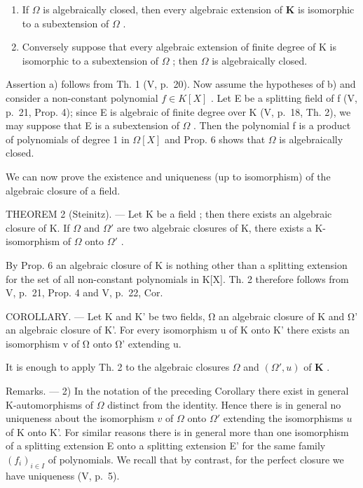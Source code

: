 \begin{enumerate}
\def\labelenumi{\alph{enumi})}
\item
  If \(\Omega\) is algebraically closed, then every algebraic extension of \(\mathbf{K}\) is isomorphic to a subextension of \(\Omega\) .
\item
  Conversely suppose that every algebraic extension of finite degree of K is isomorphic to a subextension of \(\Omega\) ; then \(\Omega\) is algebraically closed.
\end{enumerate}

Assertion a) follows from Th. 1 (V, p.~20). Now assume the hypotheses of b) and consider a non-constant polynomial \(f \in K[X]\) . Let E be a splitting field of f (V, p.~21, Prop. 4); since E is algebraic of finite degree over K (V, p.~18, Th. 2), we may suppose that E is a subextension of \(\Omega\) . Then the polynomial f is a product of polynomials of degree 1 in \(\Omega[X]\) and Prop. 6 shows that \(\Omega\) is algebraically closed.

We can now prove the existence and uniqueness (up to isomorphism) of the algebraic closure of a field.

THEOREM 2 (Steinitz). --- Let K be a field ; then there exists an algebraic closure of K. If \(\Omega\) and \(\Omega'\) are two algebraic closures of K, there exists a K-isomorphism of \(\Omega\) onto \(\Omega'\) .

By Prop. 6 an algebraic closure of K is nothing other than a splitting extension for the set of all non-constant polynomials in K{[}X{]}. Th. 2 therefore follows from V, p.~21, Prop. 4 and V, p.~22, Cor.

COROLLARY. --- Let K and K' be two fields, Ω an algebraic closure of K and Ω' an algebraic closure of K'. For every isomorphism u of K onto K' there exists an isomorphism v of Ω onto Ω' extending u.

It is enough to apply Th. 2 to the algebraic closures \(\Omega\) and \((\Omega', u)\) of \(\mathbf{K}\) .

Remarks. --- 2) In the notation of the preceding Corollary there exist in general K-automorphisms of \(\Omega\) distinct from the identity. Hence there is in general no uniqueness about the isomorphism \(v\) of \(\Omega\) onto \(\Omega'\) extending the isomorphisms \(u\) of K onto K'. For similar reasons there is in general more than one isomorphism of a splitting extension E onto a splitting extension E' for the same family \((f_i)_{i \in I}\) of polynomials. We recall that by contrast, for the perfect closure we have uniqueness (V, p.~5).

